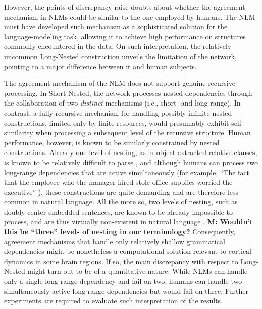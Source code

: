 However, the points of discrepancy raise doubts about whether the agreement mechanism in NLMs could be similar to the one employed by humans. The NLM must have developed such mechanism as a sophisticated solution for the language-modeling task, allowing it to achieve high performance on structures commonly encountered in the data. On such interpretation, the relatively uncommon Long-Nested  construction unveils the limitation of the network, pointing to a major difference between it and human subjects.

The agreement mechanism of the NLM does not support genuine recursive processing. In Short-Nested, the network processes nested dependencies through the collaboration of two \textit{distinct} mechanisms (i.e., short- and long-range). In contrast, a fully recursive mechanism for handling possibly infinite nested constructions, limited only by finite resources, would presumably exhibit self-similarity when processing a subsequent level of the recursive structure. Human performance, however, is known to be similarly constrained by nested constructions. Already one level of nesting, as in object-extracted relative clauses, is known to be relatively difficult to parse \citep[e.g.,][]{traxler2002processing}, and although humans can process two long-range dependencies that are active simultaneously (for example, ``The fact that the employee who the manager hired stole office supplies worried the executive'' \citep{Gibson:1998}), these constructions are quite demanding and are therefore less common in natural language. All the more so, two levels of nesting, such as doubly center-embedded sentences, are known to be already impossible to process, and are thus virtually non-existent in natural language \citep{}. \textbf{M: Wouldn't this be ``three'' levels of nesting in our terminology?} Consequently, agreement mechanisms that handle only relatively shallow grammatical dependencies might be nonetheless a computational solution relevant to cortical dynamics in some brain regions. If so, the main discrepancy with respect to Long-Nested might turn out to be of a quantitative nature. While NLMs can handle only a single long-range dependency and fail on two, humans can handle two simultaneously active long-range dependencies but would fail on three. Further experiments are required to evaluate such interpretation of the results.


